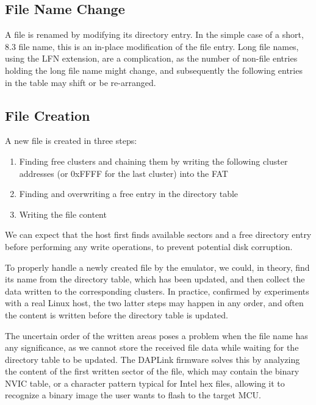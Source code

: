 \subsection{File Name Change}

A file is renamed by modifying its directory entry. In the simple case of a short, 8.3 file name, this is an in-place modification of the file entry. Long file names, using the \gls{LFN} extension, are a complication, as the number of non-file entries holding the long file name might change, and subsequently the following entries in the table may shift or be re-arranged.

\subsection{File Creation}

A new file is created in three steps:

\begin{enumerate}
	\item Finding free clusters and chaining them by writing the following cluster addresses (or 0xFFFF for the last cluster) into the \gls{FAT}
	\item Finding and overwriting a free entry in the directory table
	\item Writing the file content
\end{enumerate}

We can expect that the host first finds available sectors and a free directory entry before performing any write operations, to prevent potential disk corruption.

To properly handle a newly created file by the emulator, we could, in theory, find its name from the directory table, which has been updated, and then collect the data written to the corresponding clusters. In practice, confirmed by experiments with a real Linux host, the two latter steps may happen in any order, and often the content is written before the directory table is updated.

The uncertain order of the written areas poses a problem when the file name has any significance, as we cannot store the received file data while waiting for the directory table to be updated. The \arm DAPLink firmware solves this by analyzing the content of the first written sector of the file, which may contain the binary \gls{NVIC} table, or a character pattern typical for Intel hex files, allowing it to recognize a binary image the user wants to flash to the target \gls{MCU}.

